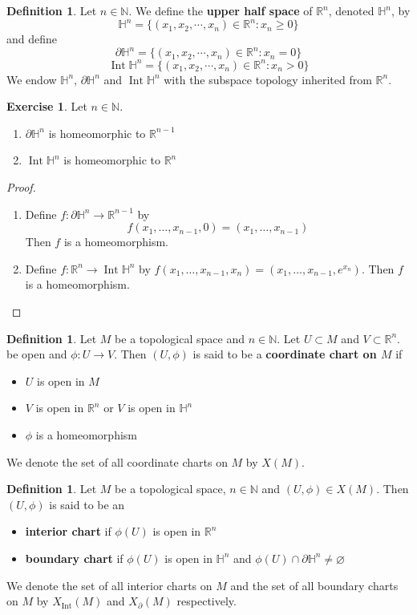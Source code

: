 \documentclass[12pt]{amsart}
\theoremstyle{definition}
\newtheorem{defn}[definition]{Definition}
\newtheorem{ex}[definition]{Exercise}
\newcommand{\N}{\mathbb{N}}
\renewcommand{\H}{\mathbb{H}}
\newcommand{\R}{\mathbb{R}}
\newcommand{\p}{\partial}
\DeclareMathOperator{\Int}{Int}
\begin{document}
	\begin{defn}
		Let $n \in \N$. We define the \textbf{upper half space} of $\R^n$, denoted $\H^n$, by $$\H^n = \{(x_1, x_2, \cdots, x_n) \in \R^n: x_n \geq 0\}$$ and define $$\partial\H^n = \{(x_1, x_2, \cdots, x_n) \in \R^n: x_n = 0\}$$ 
		$$\Int \H^n = \{(x_1, x_2, \cdots, x_n) \in \R^n: x_n > 0\}$$
		We endow $\H^n$, $\p \H^n$ and $\Int \H^n $ with the subspace topology inherited from $\R^n$.
	\end{defn}
	
	\begin{ex} Let $n \in \N$.
	\begin{enumerate}
		\item $\p \H^n$ is homeomorphic to $\R^{n-1}$
		\item $\Int \H^n$ is homeomorphic to $\R^n$
	\end{enumerate}  
	\end{ex}
	
	\begin{proof}\
	\begin{enumerate}
		\item Define $f: \p \H^n \rightarrow \R^{n-1}$ by 
		$$f(x_1, \ldots, x_{n-1}, 0) = (x_1, \ldots, x_{n-1})$$ 
		Then $f$ is a homeomorphism.
		\item Define $f: \R^n \rightarrow \Int \H^n$ by $f(x_1, \ldots, x_{n-1}, x_n) = (x_1, \ldots, x_{n-1}, e^{x_n})$. Then $f$ is a homeomorphism.
	\end{enumerate}
	\end{proof}		
	
	\begin{defn}Let $M$ be a topological space and $n \in \N$. Let $U \subset M$ and $V \subset \R^n$. be open and $\phi:U \rightarrow V$. Then $(U, \phi)$ is said to be a \textbf{coordinate chart on $M$} if 
		\begin{itemize}
			\item $U$ is open in $M$
			\item $V$ is open in $\R^n$ or $V$ is open in $\H^n$
			\item $\phi$ is a homeomorphism 
		\end{itemize}
	We denote the set of all coordinate charts on $M$ by $X(M)$.
	\end{defn}

	\begin{defn}
			Let $M$ be a topological space, $n \in \N$ and $(U, \phi) \in X(M)$. Then $(U, \phi)$ is said to be an
		\begin{itemize}
			\item \textbf{interior chart} if $\phi(U)$ is open in $\R^n$ 
			\item \textbf{boundary chart} if $\phi(U)$ is open in $\H^n$ and $\phi(U) \cap \p \H^n \neq \varnothing$
		\end{itemize}
		We denote the set of all interior charts on $M$ and the set of all boundary charts on $M$ by $X_{\Int}(M)$ and $X_{\p}(M)$ respectively. 
	\end{defn}
\end{document}
